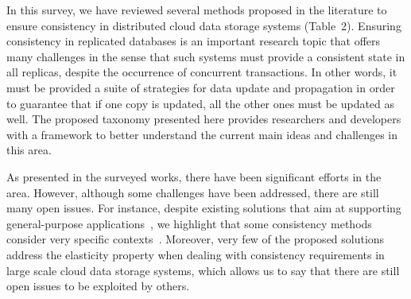 In this survey, we have reviewed several methods 
{\al  proposed in the literature} to ensure consistency in distributed cloud data storage systems (Table~2). 
Ensuring consistency in replicated databases is an important research topic that offers many challenges in the sense that such systems must provide a consistent state in all replicas, despite the occurrence of concurrent transactions. In other words, it must be provided a suite of strategies for data update and propagation in order to guarantee that if one copy is updated, all the other ones must be updated as well. 
The proposed taxonomy presented 
here provides researchers and developers with a framework to better understand the current main ideas and challenges in this area.

As presented in the surveyed works, there have been significant efforts in the area. {\al However, although some challenges have been addressed, there are still many open issues.} For instance, despite existing solutions that aim at supporting gen\-eral-purpose applications~\cite{BrandenburgerCK15,esteves2012quality,liu2014consistency,MukundanML12}, we highlight that some consistency methods consider very specific contexts~\cite{balegas2015putting,Chen:2014,chihoub2012harmony,cooper2008pnuts,Corbett:2013,Du2013,sivasubramanian2012amazon,Terry:2013}. Moreover, very few of the proposed solutions~\cite{Chen:2014,chihoub2012harmony,sivasubramanian2012amazon} address the elasticity property when dealing with consistency requirements in large scale cloud data storage systems, which allows us to say that there are still open issues to be exploited by others. %





